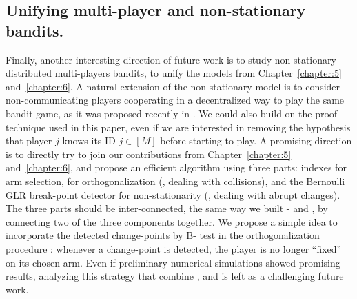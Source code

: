 \subsection*{Unifying multi-player and non-stationary bandits.}
%
%
Finally, another interesting direction of future work is to study non-stationary distributed multi-players bandits, to unify the models from Chapter~\ref{chapter:5} and~\ref{chapter:6}.
A natural extension of the non-stationary model is to consider non-communicating players cooperating in a decentralized way to play the same bandit game, as it was proposed recently in \cite{WeiSrivastava18Distributed}.
%
We could also build on the proof technique used in this paper, even if we are interested in removing the hypothesis that player $j$ knows its ID $j\in[M]$ before starting to play.
%
A promising direction is to directly try to join our contributions from Chapter~\ref{chapter:5} and~\ref{chapter:6}, and propose an efficient algorithm using three parts:
\klUCB{} indexes for arm selection,
\MCTopM{} for orthogonalization (\ie, dealing with collisions),
and the Bernoulli GLR break-point detector for non-stationarity (\ie, dealing with abrupt changes).
The three parts should be inter-connected, the same way we built \MCTopM-\klUCB{} and \GLRklUCB, by connecting two of the three components together.
We propose a simple idea to incorporate the detected change-points by B-\GLR{} test in the orthogonalization procedure \MCTopM: whenever a change-point is detected, the player is no longer ``fixed'' on its chosen arm.
%
Even if preliminary numerical simulations showed promising results,
analyzing this strategy that combine \MCTopM, \GLR{} and \klUCB{} is left as a challenging future work.



